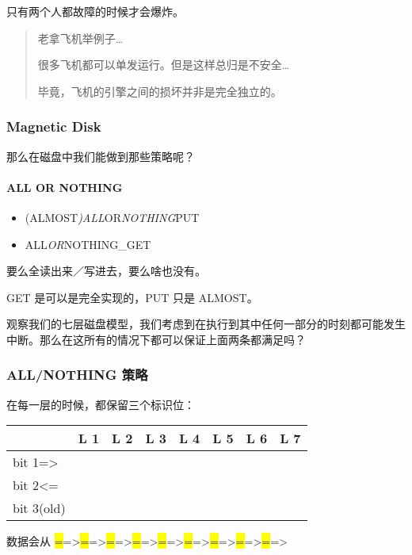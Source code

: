 \documentclass[
]{article}
\begin{document}
只有两个人都故障的时候才会爆炸。

\begin{quote}
老拿飞机举例子\ldots{}

很多飞机都可以单发运行。但是这样总归是不安全\ldots{}

毕竟，飞机的引擎之间的损坏并非是完全独立的。
\end{quote}

\hypertarget{header-n48}{%
\subsubsection{Magnetic Disk}\label{header-n48}}

那么在磁盘中我们能做到那些策略呢？

\hypertarget{header-n50}{%
\paragraph{ALL OR NOTHING}\label{header-n50}}

\begin{itemize}
\item
  (ALMOST\emph{)ALL}OR\emph{NOTHING}PUT
\item
  ALL\emph{OR}NOTHING\_GET
\end{itemize}

要么全读出来／写进去，要么啥也没有。

GET 是可以是完全实现的，PUT 只是 ALMOST。

观察我们的七层磁盘模型，我们考虑到在执行到其中任何一部分的时刻都可能发生中断。那么在这所有的情况下都可以保证上面两条都满足吗？

\hypertarget{header-n59}{%
\subsubsection{ALL/NOTHING 策略}\label{header-n59}}

在每一层的时候，都保留三个标识位：

\begin{longtable}[]{@{}llllllll@{}}
\toprule
& L 1 & L 2 & L 3 & L 4 & L 5 & L 6 & L 7\tabularnewline
\midrule
\endhead
bit 1=\textgreater{} & & & & & & &\tabularnewline
bit 2\textless= & & & & & & &\tabularnewline
bit 3(old) & & & & & & &\tabularnewline
\bottomrule
\end{longtable}

数据会从
\hl{=}=\textgreater{}\hl{=}=\textgreater{}\hl{=}=\textgreater{}\hl{=}=\textgreater{}\hl{=}=\textgreater{}\hl{=}=\textgreater{}\hl{=}=\textgreater{}\hl{=}=\textgreater{}\hl{=}=\textgreater{}
\end{document}
